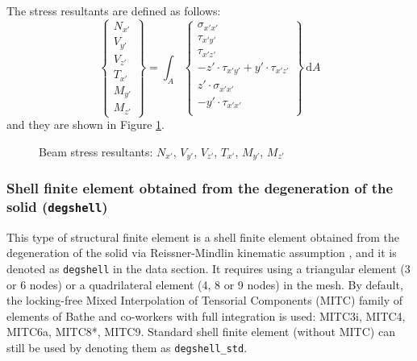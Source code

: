\documentclass[a4paper,fleqn]{book}
\begin{document}
The stress resultants are defined as follows:
\begin{equation}
\left\{
\begin{array}{c}
N_{x'} \\
V_{y'} \\
V_{z'} \\
T_{x'} \\
M_{y'} \\
M_{z'}
\end{array}
\right\}
=
\int_{A}
\left\{
\begin{array}{c}
\sigma_{x'x'} \\
\tau_{x'y'} \\
\tau_{x'z'} \\
-z'\cdot\tau_{x'y'}+y'\cdot\tau_{x'z'} \\
z'\cdot\sigma_{x'x'} \\
-y'\cdot\tau_{x'x'} \\
\end{array}
\right\}
\,\mathrm{d}A
\end{equation}
and they are shown in Figure \ref{fig:stress_resultants_beam}.

\begin{figure}[p]

\caption{Beam stress resultants: $N_{x'}$, $V_{y'}$, $V_{z'}$, $T_{x'}$, $M_{y'}$, $M_{z'}$}
\label{fig:stress_resultants_beam}
\end{figure}

\subsubsection{Shell finite element obtained from the degeneration of the solid (\texttt{degshell})}

This type of structural finite element is a shell finite element obtained from the degeneration of the solid via Reissner-Mindlin kinematic assumption \cite{ahmad1970}, and it is denoted as \texttt{degshell} in the data section. It requires using a triangular element (3 or 6 nodes) or a quadrilateral element (4, 8 or 9 nodes) in the mesh. By default, the locking-free Mixed Interpolation of Tensorial Components (MITC) family of elements of Bathe and co-workers \cite{dvorkin1984,Bathe1986,Bucalem1993,bathe2003,lee2004,lee2014} with full integration is used: MITC3i, MITC4, MITC6a, MITC8*, MITC9. Standard shell finite element (without MITC) can still be used by denoting them as \texttt{degshell\_std}.
\end{document}
